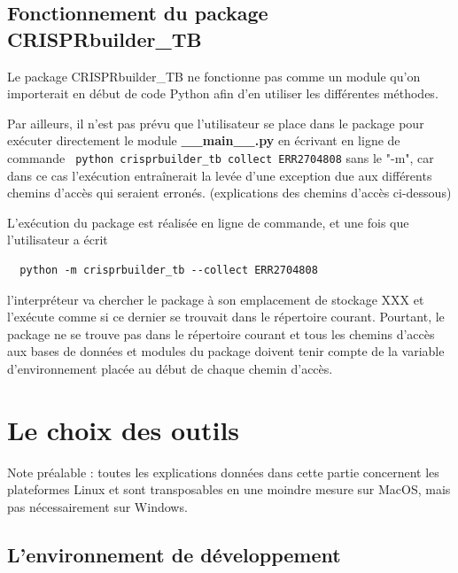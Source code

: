 \documentclass[twoside,a4paper,11pt,frenchb,openany]{report}
\begin{document}
\section{Fonctionnement du package CRISPRbuilder\_TB}



Le package CRISPRbuilder\_TB ne fonctionne pas comme un module qu'on importerait en début de code Python afin d'en utiliser les différentes méthodes.

Par ailleurs, il n'est pas prévu que l'utilisateur se place dans le package pour exécuter directement le module \textbf{\_\_main\_\_.py} en écrivant en ligne de commande
\texttt{ python crisprbuilder\_tb \textemdash \textemdash collect ERR2704808}
sans le "-m", car dans ce cas l'exécution entraînerait la levée d'une exception due aux différents chemins d'accès qui seraient erronés. (explications des chemins d'accès ci-dessous)

L'exécution du package est réalisée en ligne de commande, et une fois que l'utilisateur a écrit 
\begin{verbatim}  python -m crisprbuilder_tb --collect ERR2704808\end{verbatim}

l'interpréteur va chercher le package à son emplacement de stockage XXX et l'exécute comme si ce dernier se trouvait dans le répertoire courant. Pourtant, le package ne se trouve pas dans le répertoire courant et tous les chemins d'accès aux bases de données et modules du package doivent tenir compte de la variable d'environnement placée au début de chaque chemin d'accès.



\chapter{Le choix des outils}

Note préalable : toutes les explications données dans cette partie concernent les plateformes Linux et sont transposables en une moindre mesure sur MacOS, mais pas nécessairement sur Windows.




\section{L'environnement de développement}
\end{document}
